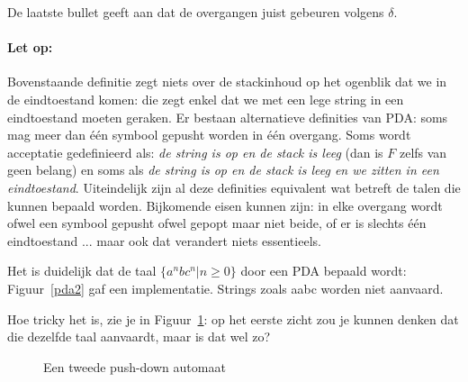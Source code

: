 De laatste bullet geeft aan dat de overgangen juist gebeuren volgens $\delta$.

\paragraph{Let op:}

Bovenstaande definitie zegt niets over de stackinhoud op het ogenblik
dat we in de eindtoestand komen: die zegt enkel dat we met een lege
string in een eindtoestand moeten geraken. Er bestaan alternatieve
definities van PDA: soms mag meer dan \'{e}\'{e}n symbool gepusht
worden in \'{e}\'{e}n overgang. Soms wordt acceptatie gedefinieerd
als: {\em de string is op en de stack is leeg} (dan is $F$ zelfs van geen
belang) en soms als {\em de string is op en de stack is leeg en we
zitten in een eindtoestand}. Uiteindelijk zijn al deze definities
equivalent wat betreft de talen die kunnen bepaald worden. Bijkomende
eisen kunnen zijn: in elke overgang wordt ofwel een symbool gepusht
ofwel gepopt maar niet beide, of er is slechts \'{e}\'{e}n
eindtoestand ...  maar ook dat verandert niets essentieels.




Het is duidelijk dat de taal $\{a^nbc^n|n \geq 0\}$ door een PDA
bepaald wordt: Figuur~\ref{pda2} gaf een implementatie. Strings zoals
aabc worden niet aanvaard.

Hoe tricky het is, zie je in Figuur~\ref{pda1}: op het eerste zicht
zou je kunnen denken dat die dezelfde taal aanvaardt, maar is dat wel
zo?

\begin{figure}[h]
\caption{Een tweede push-down automaat\label{pda1}}
\end{figure}

